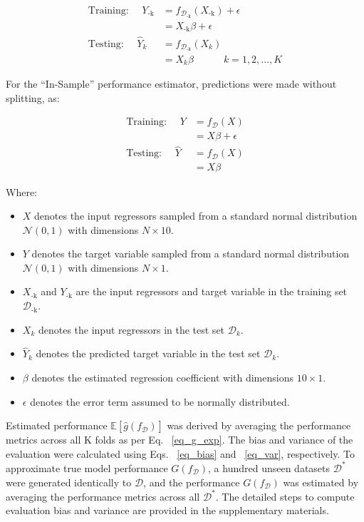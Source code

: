 \begin{equation} \label{eq_kfoldcv}
    \begin{split}
	\text{Training: } \quad Y_{\text{-k}} &= f_{\mathcal{D}_{\text{-k}}}(X_{\text{-k}})+\epsilon \\
    &= X_{\text{-k}} \beta + \epsilon \\
    \text{Testing: } \quad \hat{Y}_k &= f_{\mathcal{D}_{\text{-k}}}(X_k) \\
    &=X_k \beta \quad \quad \quad k=1,2,\ldots,K
    \end{split}
\end{equation}

For the “In-Sample” performance estimator, predictions were made without splitting, as:

\begin{equation} \label{eq_insample}
    \begin{split}
    	\text{Training: } \quad Y &= f_\mathcal{D}(X) \\ &= X\beta + \epsilon \\
        \text{Testing: } \quad \hat{Y} &= f_\mathcal{D}(X) \\ &=X \beta
    \end{split}
\end{equation}

Where:
\begin{itemize}
  \item \( X \) denotes the input regressors sampled from a standard normal distribution \( \mathcal{N}(0, 1) \) with dimensions \( N \times 10 \).
  \item \( Y \) denotes the target variable sampled from a standard normal distribution \( \mathcal{N}(0, 1) \) with dimensions \( N \times 1 \).
  \item \( X_\text{-k} \) and \( Y_\text{-k} \) are the input regressors and target variable in the training set \( \mathcal{D}_\text{-k} \).
  \item \( X_k \) denotes the input regressors in the test set \( \mathcal{D}_k \).
  \item \( \hat{Y}_k \) denotes the predicted target variable in the test set \( \mathcal{D}_k \).
  \item \( \beta \) denotes the estimated regression coefficient with dimensions \( 10 \times 1 \).
  \item \( \epsilon \) denotes the error term assumed to be normally distributed.
\end{itemize}

Estimated performance $\mathbb{E}[\hat{g}(f_\mathcal{D})]$ was derived by averaging the performance metrics across all K folds as per Eq. ~\ref{eq_g_exp}. The bias and variance of the evaluation were calculated using Eqs. ~\ref{eq_bias} and ~\ref{eq_var}, respectively. To approximate true model performance $G(f_\mathcal{D})$, a hundred unseen datasets $\mathcal{D}^\ast$ were generated identically to $\mathcal{D}$, and the performance $G(f_\mathcal{D})$ was estimated by averaging the performance metrics across all $\mathcal{D}^\ast$. The detailed steps to compute evaluation bias and variance are provided in the supplementary materials.

